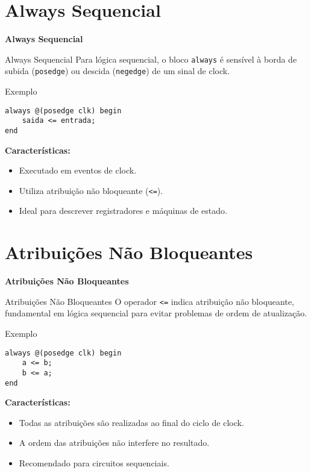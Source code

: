 \documentclass[aspectratio=169,xcolor=dvipsnames]{beamer}
\begin{document}
\section{Always Sequencial}

\begin{frame}
    \Huge{\centerline{\textbf{Always Sequencial}}}
\end{frame}

\begin{frame}[fragile]{Always Sequencial}
Para lógica sequencial, o bloco \texttt{always} é sensível à borda de subida (\texttt{posedge}) ou descida (\texttt{negedge}) de um sinal de clock.

\begin{block}{Exemplo}
\begin{verbatim}
always @(posedge clk) begin
    saida <= entrada;
end
\end{verbatim}
\end{block}

\textbf{Características:}
\begin{itemize}
    \item Executado em eventos de clock.
    \item Utiliza atribuição não bloqueante (\texttt{<=}).
    \item Ideal para descrever registradores e máquinas de estado.
\end{itemize}
\end{frame}

\section{Atribuições Não Bloqueantes}

\begin{frame}
    \Huge{\centerline{\textbf{Atribuições Não Bloqueantes}}}
\end{frame}

\begin{frame}[fragile]{Atribuições Não Bloqueantes}
O operador \texttt{<=} indica atribuição não bloqueante, fundamental em lógica sequencial para evitar problemas de ordem de atualização.

\begin{block}{Exemplo}
\begin{verbatim}
always @(posedge clk) begin
    a <= b;
    b <= a;
end
\end{verbatim}
\end{block}

\textbf{Características:}
\begin{itemize}
    \item Todas as atribuições são realizadas ao final do ciclo de clock.
    \item A ordem das atribuições não interfere no resultado.
    \item Recomendado para circuitos sequenciais.
\end{itemize}
\end{frame}

\end{document}
